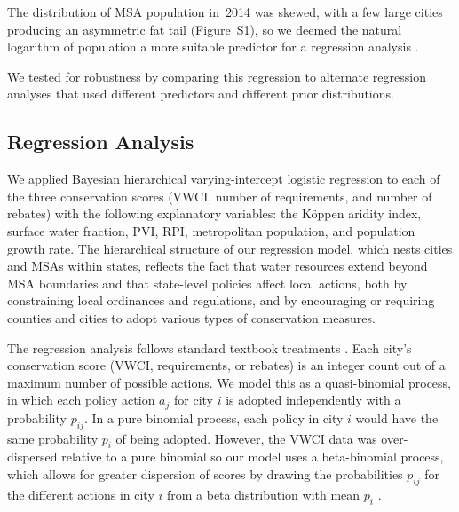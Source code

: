 \documentclass[draft,linenumbers]{agujournal}
\begin{document}
The distribution of MSA population in~2014 was skewed, with
a few large cities producing an asymmetric fat tail (Figure~S1),
so we deemed the natural logarithm of population
a more suitable predictor
for a regression analysis \citep[pp.~59--61]{gelman:arm:2007}.

We tested for robustness by comparing this regression to
alternate regression analyses that used different predictors and different
prior distributions.

\subsection{Regression Analysis}
We applied Bayesian hierarchical varying-intercept
logistic regression to each of the
three conservation scores (VWCI, number of requirements, and number of rebates)
with the following explanatory variables: the K\"oppen aridity index, surface
water fraction, PVI, RPI, metropolitan population, and population growth rate.
The hierarchical structure of our regression model, which nests cities and MSAs
within states, reflects the fact that water resources extend beyond MSA
boundaries and that state-level policies affect local actions, both by
constraining local ordinances and regulations, and by encouraging or requiring
counties and cities to adopt various types of conservation measures.

The regression
analysis follows standard textbook treatments
\citep{gelman:arm:2007,gelman:bda:2014}.
Each city's conservation score (VWCI, requirements, or rebates) is
an integer count out of a maximum number of possible actions.
We model this as a quasi-binomial process, in which each policy action $a_j$
for city $i$ is
adopted independently with a probability $p_{ij}$.
In a pure binomial process, each policy in city $i$ would have the same
probability $p_i$ of being adopted.
However, the VWCI data was over-dispersed relative to a pure binomial
so our model uses a beta-binomial process,
which
allows for greater dispersion of scores by drawing the probabilities $p_{ij}$
for the different actions in city $i$ from a beta distribution with mean $p_i$
\citep[pp.~437--38]{gelman:bda:2014}.
\end{document}
